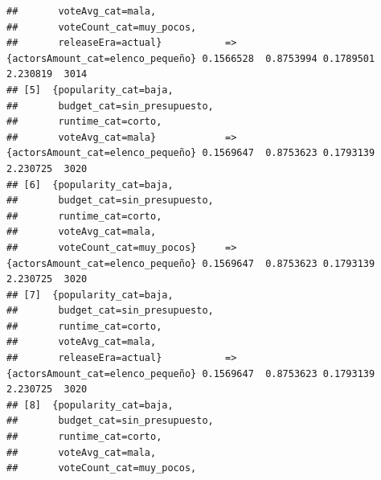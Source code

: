 \documentclass[
]{article}
\begin{document}
\begin{verbatim}
##       voteAvg_cat=mala,                                                                                              
##       voteCount_cat=muy_pocos,                                                                                       
##       releaseEra=actual}           => {actorsAmount_cat=elenco_pequeño} 0.1566528  0.8753994 0.1789501 2.230819  3014
## [5]  {popularity_cat=baja,                                                                                           
##       budget_cat=sin_presupuesto,                                                                                    
##       runtime_cat=corto,                                                                                             
##       voteAvg_cat=mala}            => {actorsAmount_cat=elenco_pequeño} 0.1569647  0.8753623 0.1793139 2.230725  3020
## [6]  {popularity_cat=baja,                                                                                           
##       budget_cat=sin_presupuesto,                                                                                    
##       runtime_cat=corto,                                                                                             
##       voteAvg_cat=mala,                                                                                              
##       voteCount_cat=muy_pocos}     => {actorsAmount_cat=elenco_pequeño} 0.1569647  0.8753623 0.1793139 2.230725  3020
## [7]  {popularity_cat=baja,                                                                                           
##       budget_cat=sin_presupuesto,                                                                                    
##       runtime_cat=corto,                                                                                             
##       voteAvg_cat=mala,                                                                                              
##       releaseEra=actual}           => {actorsAmount_cat=elenco_pequeño} 0.1569647  0.8753623 0.1793139 2.230725  3020
## [8]  {popularity_cat=baja,                                                                                           
##       budget_cat=sin_presupuesto,                                                                                    
##       runtime_cat=corto,                                                                                             
##       voteAvg_cat=mala,                                                                                              
##       voteCount_cat=muy_pocos,                                                                                       

\end{verbatim}
\end{document}
